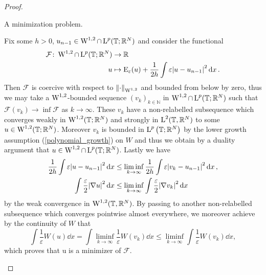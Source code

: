 \begin{proof}
	\begin{description}[wide=0pt]
		\item[Step 1:] A minimization problem.
		
		Fix some $ h > 0 $, $ u_{ n - 1 } \in \operatorname{W}^{1 , 2 }\cap \operatorname{L}^{ p } ( \operatorname{\mathbb{T}}; \mathbb{ R }^{ N } ) $ and consider the functional
		\begin{align}
			\label{de_giorgi_min_functional}
			\mathcal{ F } \colon \operatorname{W}^{ 1, 2 } \cap \operatorname{L}^{ p } ( \operatorname{\mathbb{T}} ; \mathbb{ R }^{ N } )
			& \to
			\mathbb{ R }
			\\
			u & \mapsto 
			\operatorname{E}_{ \varepsilon } ( u ) + 
			\frac{ 1 }{ 2h } \int \varepsilon \abs{ u - u_{ n - 1 } }^{ 2 } \dd{x }
			\notag .
		\end{align}
		Then $ \mathcal{ F } $ is coercive with respect to 
		$ \norm{ \cdot }_{ \operatorname{W}^{ 1, 2 } } $ 
		and bounded from below by zero, thus we may take a $ \operatorname{W}^{ 1 , 2 } $-bounded sequence  
		$ (v_{ k } )_{ k \in \mathbb{ N } } $ in $ \operatorname{W}^{ 1 , 2} \cap \operatorname{L}^{ p } ( \operatorname{\mathbb{T}} ; \mathbb{ R }^{ N } ) $ such that 
		$ \mathcal{ F } ( v_{ k } ) \to \inf \mathcal{ F } $ as $ k \to \infty $. 
		These $ v_{ k } $ have a non-relabelled subsequence which converges weakly in $ \operatorname{W}^{ 1 , 2 } ( \operatorname{\mathbb{T}} ; \mathbb{ R }^{ N } ) $ and strongly in $ \operatorname{L}^{ 2 } ( \operatorname{\mathbb{T}}, \mathbb{ R }^{ N } ) $ to some $ u \in \operatorname{W}^{ 1, 2 } ( \operatorname{\mathbb{T}}; \mathbb{ R }^{ N } ) $.
		Moreover $ v_{ k } $ is bounded in $ \operatorname{L}^{ p } \left( \operatorname{\mathbb{T}} ; \mathbb{ R }^{ N } \right)$ by the lower growth assumption (\ref{polynomial_growth}) on $ W $
		and thus we obtain by a duality argument that $ u \in \operatorname{W}^{ 1 , 2 } 
		\cap \operatorname{L}^{ p } ( \operatorname{\mathbb{T}} ; \mathbb{ R }^{ N } ) $.
		Lastly we have 
		\begin{align*}
			\frac{ 1 }{ 2 h }
			\int \varepsilon \abs{ u - u_{ n - 1 } }^{ 2 } \dd{ x}
			& \leq
			\liminf_{ k \to \infty }
			\frac{ 1 }{ 2h }
			\int \varepsilon \abs{ v_{ k } - u_{ n -1 } }^{ 2 } \dd{ x },
			\\
			\int \frac{ \varepsilon }{ 2 } \abs{ \nabla u }^{ 2 } \dd{ x }
			& \leq
			\liminf_{ k \to \infty }
			\int \frac{ \varepsilon }{ 2 } \abs{ \nabla v_{ k } }^{ 2 } \dd{ x }
		\end{align*}
		by the weak convergence in $ \operatorname{W}^{ 1 , 2 } ( \operatorname{\mathbb{T}} , \mathbb{ R }^{ N } )$.
		By passing to another non-relabelled subsequence which converges 
		pointwise almost everywhere, we moreover achieve by the continuity of $ 
		W $ that
		\begin{equation*}
			\int \frac{ 1 }{ \varepsilon } W ( u ) \dd{ x }
			=
			\int \liminf_{ k \to \infty } \frac{ 1 }{ \varepsilon } W ( v_{k } ) \dd{ x }
			\leq
			\liminf_{ k \to \infty } \int \frac{ 1 }{ \varepsilon } W ( v_{ k } ) \dd{x},
		\end{equation*}
		which proves that u is a minimizer of $ \mathcal{ F } $.
		

\end{description}
\end{proof}

